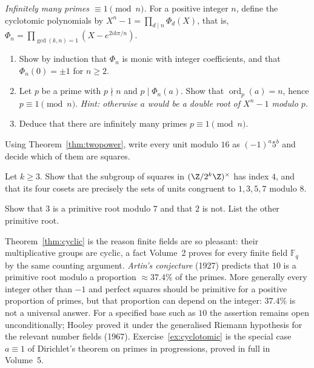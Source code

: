 \begin{exercise}[$\star\star\star$]\label{ex:cyclotomic}
\emph{Infinitely many primes $\equiv1\pmod n$.} For a positive integer $n$, define the cyclotomic polynomials by $X^n-1=\prod_{d\mid n}\Phi_d(X)$, that is, $\Phi_n=\prod_{\gcd(k,n)=1}\left(X-e^{2ik\pi/n}\right)$.
\begin{enumerate}[label=(\alph*)]
\item Show by induction that $\Phi_n$ is monic with integer coefficients, and that $\Phi_n(0)=\pm1$ for $n\ge2$.
\item Let $p$ be a prime with $p\nmid n$ and $p\mid\Phi_n(a)$. Show that $\operatorname{ord}_p(a)=n$, hence $p\equiv1\pmod n$. \emph{Hint: otherwise $a$ would be a double root of $X^n-1$ modulo $p$.}
\item Deduce that there are infinitely many primes $p\equiv1\pmod n$.
\end{enumerate}
\end{exercise}

\begin{exercise}[$\star$]\label{ex:t1-units16}
Using Theorem~\ref{thm:twopower}, write every unit modulo $16$ as $(-1)^a5^b$ and decide which of them are squares.
\end{exercise}

\begin{exercise}[$\star\star$]\label{ex:t1-square-cosets}
Let $k\ge3$. Show that the subgroup of squares in $(\Z/2^k\Z)^\times$ has index $4$, and that its four cosets are precisely the sets of units congruent to $1,3,5,7$ modulo $8$.
\end{exercise}

\begin{exercise}[$\star$]\label{ex:t1-gen7}
Show that $3$ is a primitive root modulo $7$ and that $2$ is not. List the other primitive root.
\end{exercise}

\begin{beauty}
Theorem~\ref{thm:cyclic} is the reason finite fields are so pleasant: their multiplicative groups are cyclic, a fact Volume~2 proves for every finite field $\mathbb F_q$ by the same counting argument. \emph{Artin's conjecture} (1927) predicts that $10$ is a primitive root modulo a proportion $\approx37.4\%$ of the primes. More generally every integer other than $-1$ and perfect squares should be primitive for a positive proportion of primes, but that proportion can depend on the integer: $37.4\%$ is not a universal answer. For a specified base such as $10$ the assertion remains open unconditionally; Hooley proved it under the generalised Riemann hypothesis for the relevant number fields (1967). Exercise~\ref{ex:cyclotomic} is the special case $a\equiv1$ of Dirichlet's theorem on primes in progressions, proved in full in Volume~5.
\end{beauty}

